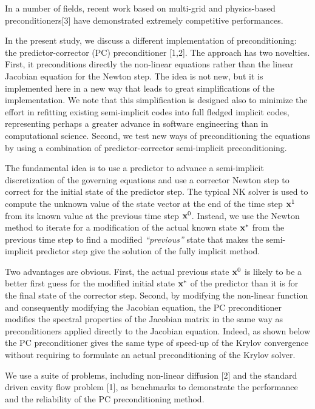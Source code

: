 \documentclass[twosided]{report}
\begin{document}
In
a number of fields, recent work based on multi-grid and
physics-based preconditioners[3] have demonstrated extremely
competitive performances.

In the present study, we
discuss a different implementation of preconditioning: the
predictor-corrector (PC) preconditioner [1,2]. The approach
has two novelties. First, it preconditions directly the
non-linear equations rather than the linear Jacobian
equation for the Newton step. The idea is not
new, but it is implemented here in a new way
that leads to great simplifications of the implementation.
We note that this simplification is designed also to
minimize the effort in refitting existing semi-implicit
codes into full fledged implicit codes, representing perhaps
a greater advance in software engineering than in
computational science. Second, we test new ways of
preconditioning the equations by using a combination of
predictor-corrector semi-implicit preconditioning.

The
fundamental idea is to use a predictor to advance a
semi-implicit discretization of the governing equations and
use a corrector Newton step to correct for the initial state
of the predictor step. The typical NK solver is used to
compute the unknown value of the state vector at the end of
the time step ${\bf x}^{1}$ from its known value at the
previous time step ${\bf x}^0$. Instead, we use the Newton
method to iterate for a modification of the actual known
state $ {\bf x}^{*}$ from the previous time step to find a
modified {\it ``previous''} state that makes the semi-implicit
predictor step give the solution of the fully implicit
method.

Two advantages are obvious. First, the actual
previous state ${\bf x}^0$ is likely to be a better first
guess for the modified initial state $ {\bf x}^{*}$ of the
predictor than it is for the final state of the corrector
step. Second, by modifying the non-linear function and
consequently modifying the Jacobian equation, the PC
preconditioner modifies the spectral properties of the
Jacobian matrix in the same way as preconditioners applied
directly to the Jacobian equation. Indeed, as shown below
the PC preconditioner gives the same type of speed-up of the
Krylov convergence without requiring to formulate an actual
preconditioning of the Krylov solver.

We use a suite of
problems, including non-linear diffusion [2] and the standard
driven cavity flow problem [1], as benchmarks to demonstrate
the performance and the reliability of the PC
preconditioning method.
\end{document}
